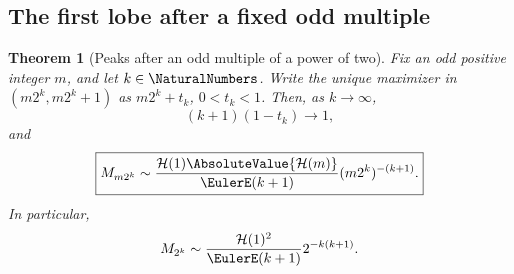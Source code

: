 \documentclass[11pt,oneside]{article}
\numberwithin{equation}{section}
\newtheorem{theorem}{Theorem}[section]
\theoremstyle{definition}
\theoremstyle{remark}
\begin{document}
\subsection{The first lobe after a fixed odd multiple}

\begin{theorem}[Peaks after an odd multiple of a power of two]
\label{thm:odd-multiple-valley}
Fix an odd positive integer $m$, and let $k\in\NaturalNumbers$.  Write the unique
maximizer in $(m2^k,m2^k+1)$ as $m2^k+t_k$, $0<t_k<1$.  Then, as $k\to\infty$,
\begin{equation}
 (k+1)(1-t_k)\longrightarrow1,
 \label{eq:odd-multiple-location}
\end{equation}
and
\begin{equation}
 \boxed{\displaystyle
 M_{m2^k}\sim
 \frac{\mathcal H(1)\AbsoluteValue{\mathcal H(m)}}{\EulerE(k+1)}
 (m2^k)^{-(k+1)}.}
 \label{eq:odd-multiple-amplitude}
\end{equation}
In particular,
\begin{equation}
 M_{2^k}\sim\frac{\mathcal H(1)^2}{\EulerE(k+1)}2^{-k(k+1)}.
 \label{eq:power-two-first-lobe}
\end{equation}
\end{theorem}
\end{document}
